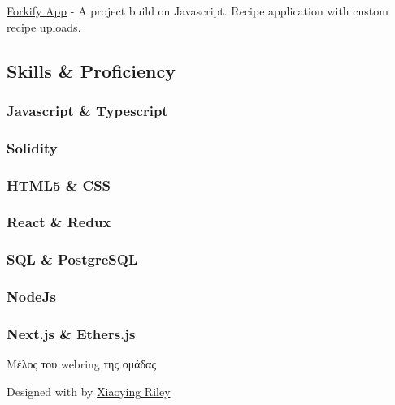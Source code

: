 \documentclass[english,]{article}
\begin{document}
{ \href{https://github.com/CptMike/ForkifyApp}{Forkify App} } - {A
project build on Javascript. Recipe application with custom recipe
uploads.}

\hypertarget{skills-proficiency}{%
\subsection{\texorpdfstring{{ \emph{} \emph{} } Skills \&
Proficiency}{    Skills \& Proficiency}}\label{skills-proficiency}}

\hypertarget{javascript-typescript}{%
\subsubsection{Javascript \& Typescript}\label{javascript-typescript}}

\hypertarget{solidity}{%
\subsubsection{Solidity}\label{solidity}}

\hypertarget{html5-css}{%
\subsubsection{HTML5 \& CSS}\label{html5-css}}

\hypertarget{react-redux}{%
\subsubsection{React \& Redux}\label{react-redux}}

\hypertarget{sql-postgresql}{%
\subsubsection{SQL \& PostgreSQL}\label{sql-postgresql}}

\hypertarget{nodejs}{%
\subsubsection{NodeJs}\label{nodejs}}

\hypertarget{next.js-ethers.js}{%
\subsubsection{Next.js \& Ethers.js}\label{next.js-ethers.js}}

Μέλος του webring της ομάδας
\href{https://cont1nental.netlify.app/\%22\%3ECont1nental\%3C/a\%3E\%20webring\%3C/p\%3E\%0A\%20\%20\%20\%20\%20\%20\%3Ca\%20href=}{}
\href{https://cont1nental.netlify.app/random\%22\%3EΤυχαία\%20σελίδα\%3C/a\%3E\%0A\%20\%20\%20\%20\%20\%20\%3Ca\%20href=}{}

{Designed with \emph{} by \href{http://themes.3rdwavemedia.com}{Xiaoying
Riley}}
\end{document}
